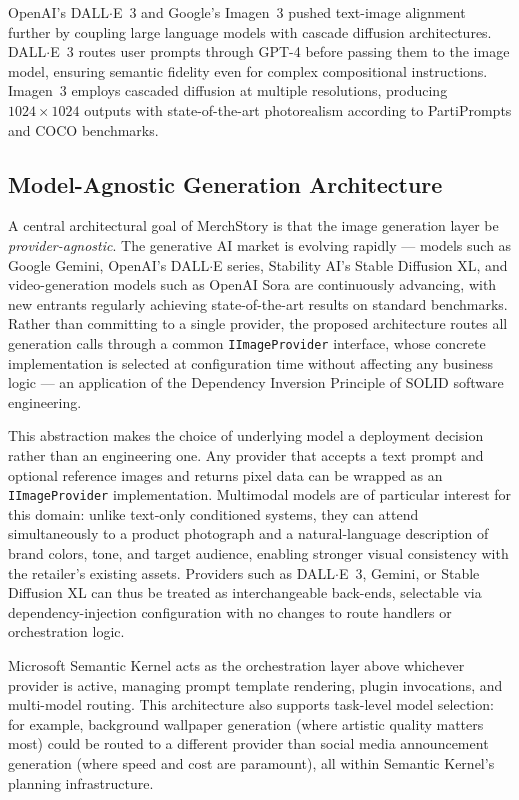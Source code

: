 \documentclass[12pt, a4paper]{report}
\begin{document}
\medskip\noindent
OpenAI's DALL$\cdot$E~3 and Google's Imagen~3 pushed text-image alignment
further by coupling large language models with cascade diffusion architectures.
DALL$\cdot$E~3 routes user prompts through GPT-4 before passing them to the
image model, ensuring semantic fidelity even for complex compositional
instructions.  Imagen~3 employs cascaded diffusion at multiple resolutions,
producing $1024{\times}1024$ outputs with state-of-the-art photorealism
according to PartiPrompts and COCO benchmarks.

\subsection{Model-Agnostic Generation Architecture}

A central architectural goal of MerchStory is that the image generation layer
be \emph{provider-agnostic}.  The generative AI market is evolving rapidly ---
models such as Google Gemini, OpenAI's DALL$\cdot$E series, Stability AI's
Stable Diffusion XL, and video-generation models such as OpenAI Sora are
continuously advancing, with new entrants regularly achieving state-of-the-art
results on standard benchmarks.  Rather than committing to a single provider,
the proposed architecture routes all generation calls through a common
\texttt{IImageProvider} interface, whose concrete implementation is selected
at configuration time without affecting any business logic --- an application
of the Dependency Inversion Principle of SOLID software engineering.

\medskip\noindent
This abstraction makes the choice of underlying model a deployment decision
rather than an engineering one.  Any provider that accepts a text prompt and
optional reference images and returns pixel data can be wrapped as an
\texttt{IImageProvider} implementation.  Multimodal models are of particular
interest for this domain: unlike text-only conditioned systems, they can attend
simultaneously to a product photograph and a natural-language description of
brand colors, tone, and target audience, enabling stronger visual consistency
with the retailer's existing assets.  Providers such as DALL$\cdot$E~3,
Gemini, or Stable Diffusion XL can thus be treated as interchangeable
back-ends, selectable via dependency-injection configuration with no changes to
route handlers or orchestration logic.

\medskip\noindent
Microsoft Semantic Kernel acts as the orchestration layer above whichever
provider is active, managing prompt template rendering, plugin invocations,
and multi-model routing.  This architecture also supports task-level model
selection: for example, background wallpaper generation (where artistic quality
matters most) could be routed to a different provider than social media
announcement generation (where speed and cost are paramount), all within
Semantic Kernel's planning infrastructure.
\end{document}
